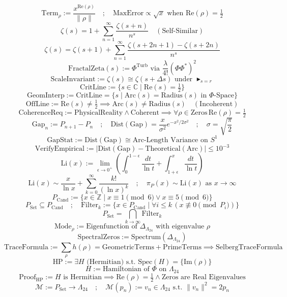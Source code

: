 \documentclass{article}
\newcommand{\AXIOM}{\blacktriangleright}
\newcommand{\DEF}{:=}
\newcommand{\EQUIV}{\cong}
\newcommand{\INT}{\mathbb{Z}}
\newcommand{\COMPLEX}{\mathbb{C}}
\newcommand{\PICONST}{\pi}
\newcommand{\ZETA}{\zeta}
\newcommand{\LEECH}{\Lambda_{24}}
\begin{document}
\[
\text{Term}_\rho \DEF \frac{x^{\text{Re}(\rho)}}{\|\rho\|} \quad ; \quad \text{MaxError} \propto \sqrt{x} \text{ when } \text{Re}(\rho)=\tfrac{1}{2}
\]
\[
\ZETA(s) = 1 + \sum_{n=1}^\infty \frac{\ZETA(s+n)}{n^s} \quad (\text{Self-Similar})
\]
\[
\ZETA(s) = \ZETA(s+1) + \sum_{n=1}^\infty \frac{\ZETA(s+2n+1) - \ZETA(s+2n)}{n^s}
\]
\[
\text{FractalZeta}(s) \DEF \Phi^{\text{Turb}} \text{ via } \frac{\lambda}{4!}(\Phi\Phi^\ast)^2
\]
\[
\text{ScaleInvariant} \DEF \ZETA(s) \EQUIV \ZETA(s+\Delta s) \text{ under } \AXIOM_{s=r}
\]
\[
\text{CritLine} \DEF \{s \in \COMPLEX \mid \text{Re}(s) = \tfrac{1}{2}\}
\]
\[
\text{GeomInterp} \DEF \text{CritLine} = \{s \mid \text{Arc}(s) = \text{Radius}(s) \text{ in } \Phi\text{-Space}\}
\]
\[
\text{OffLine} \DEF \text{Re}(s) \neq \tfrac{1}{2} \implies \text{Arc}(s) \neq \text{Radius}(s) \quad (\text{Incoherent})
\]
\[
\text{CoherenceReq} \DEF \text{PhysicalReality} \land \text{Coherent} \implies \forall \rho \in \text{Zeros} \, \text{Re}(\rho) = \tfrac{1}{2}
\]
\[
\text{Gap}_n \DEF P_{n+1} - P_n \quad ; \quad \text{Dist}(\text{Gap}) = \frac{x}{\sigma^2} e^{-x^2/2\sigma^2} \quad ; \quad \sigma = \sqrt{\frac{\PICONST}{2}}
\]
\[
\text{GapStat} \DEF \text{Dist}(\text{Gap}) \EQUIV \text{Arc-Length Variance on } S^1
\]
\[
\text{VerifyEmpirical} \DEF |\text{Dist}(\text{Gap}) - \text{Theoretical}(\text{Arc})| \leq 10^{-3}
\]
\[
\text{Li}(x) \DEF \lim_{\epsilon \to 0^+} \left( \int_0^{1-\epsilon} \frac{dt}{\ln t} + \int_{1+\epsilon}^x \frac{dt}{\ln t} \right)
\]
\[
\text{Li}(x) \sim \frac{x}{\ln x} + \sum_{k=0}^\infty \frac{k!}{(\ln x)^k} \quad ; \quad \pi_P(x) \sim \text{Li}(x) \text{ as } x \to \infty
\]
\[
P_{\text{Cand}} \DEF \{x \in \INT \mid x \equiv 1 \pmod{6} \lor x \equiv 5 \pmod{6}\}
\]
\[
P_{\text{Set}} \subseteq P_{\text{Cand}} \quad ; \quad \text{Filter}_k \DEF \{x \in P_{\text{Cand}} \mid \forall i \leq k \, (x \not\equiv 0 \pmod{P_i})\}
\]
\[
P_{\text{Set}} = \bigcap_{k \to \infty} \text{Filter}_k
\]
\[
\text{Mode}_\rho \DEF \text{Eigenfunction of } \Delta_{\LEECH} \text{ with eigenvalue } \rho
\]
\[
\text{SpectralZeros} \DEF \text{Spectrum}(\Delta_{\LEECH})
\]
\[
\text{TraceFormula} \DEF \sum_{\rho} h(\rho) = \text{GeometricTerms} + \text{PrimeTerms} \implies \text{SelbergTraceFormula}
\]
\[
\text{HP} \DEF \exists H \text{ (Hermitian)} \text{ s.t. } \text{Spec}(H) = \{\text{Im}(\rho)\}
\]
\[
H \DEF \text{Hamiltonian of } \Phi \text{ on } \LEECH
\]
\[
\text{Proof}_{\text{HP}} \DEF H \text{ is Hermitian} \implies \text{Re}(\rho) = \tfrac{1}{2} \land \text{Zeros are Real Eigenvalues}
\]
\[
\mathcal{M} \DEF P_{\text{Set}} \to \LEECH \quad ; \quad \mathcal{M}(p_n) \DEF v_n \in \LEECH \text{ s.t. } \|v_n\|^2 = 2p_n
\]
\end{document}
